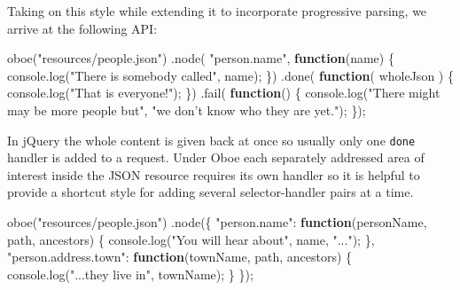 \documentclass[12pt, ]{article}
\newenvironment{Shaded}{}{}
\newcommand{\KeywordTok}[1]{\textcolor[rgb]{0.00,0.44,0.13}{\textbf{{#1}}}}
\newcommand{\StringTok}[1]{\textcolor[rgb]{0.25,0.44,0.63}{{#1}}}
\newcommand{\OtherTok}[1]{\textcolor[rgb]{0.00,0.44,0.13}{{#1}}}
\newcommand{\FunctionTok}[1]{\textcolor[rgb]{0.02,0.16,0.49}{{#1}}}
\newcommand{\NormalTok}[1]{{#1}}
\begin{document}
Taking on this style while extending it to incorporate progressive
parsing, we arrive at the following API:

\begin{Shaded}
\begin{Highlighting}[]
\FunctionTok{oboe}\NormalTok{(}\StringTok{"resources/people.json"}\NormalTok{)}
   \NormalTok{.}\FunctionTok{node}\NormalTok{( }\StringTok{"person.name"}\NormalTok{, }\KeywordTok{function}\NormalTok{(name) \{}
      \OtherTok{console}\NormalTok{.}\FunctionTok{log}\NormalTok{(}\StringTok{"There is somebody called"}\NormalTok{, name);   }
   \NormalTok{\})}
   \NormalTok{.}\FunctionTok{done}\NormalTok{( }\KeywordTok{function}\NormalTok{( wholeJson ) \{}
      \OtherTok{console}\NormalTok{.}\FunctionTok{log}\NormalTok{(}\StringTok{"That is everyone!"}\NormalTok{);}
   \NormalTok{\})}
   \NormalTok{.}\FunctionTok{fail}\NormalTok{( }\KeywordTok{function}\NormalTok{() \{}
      \OtherTok{console}\NormalTok{.}\FunctionTok{log}\NormalTok{(}\StringTok{"There might may be more people but"}\NormalTok{,}
                  \StringTok{"we don't know who they are yet."}\NormalTok{);}
   \NormalTok{\});}
\end{Highlighting}
\end{Shaded}

In jQuery the whole content is given back at once so usually only one
\texttt{done} handler is added to a request. Under Oboe each separately
addressed area of interest inside the JSON resource requires its own
handler so it is helpful to provide a shortcut style for adding several
selector-handler pairs at a time.

\begin{Shaded}
\begin{Highlighting}[]
\FunctionTok{oboe}\NormalTok{(}\StringTok{"resources/people.json"}\NormalTok{)}
   \NormalTok{.}\FunctionTok{node}\NormalTok{(\{  }
      \StringTok{"person.name"}\NormalTok{: }\KeywordTok{function}\NormalTok{(personName, path, ancestors) \{}
         \OtherTok{console}\NormalTok{.}\FunctionTok{log}\NormalTok{(}\StringTok{"You will hear about"}\NormalTok{, name, }\StringTok{"..."}\NormalTok{);}
      \NormalTok{\},}
      \StringTok{"person.address.town"}\NormalTok{: }\KeywordTok{function}\NormalTok{(townName, path, ancestors) \{}
         \OtherTok{console}\NormalTok{.}\FunctionTok{log}\NormalTok{(}\StringTok{"...they live in"}\NormalTok{, townName);}
      \NormalTok{\}}
   \NormalTok{\});}
\end{Highlighting}
\end{Shaded}
\end{document}
